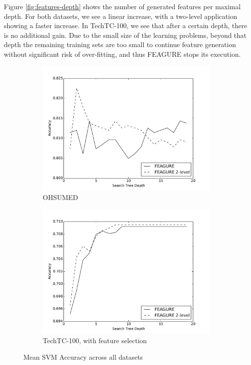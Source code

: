 \documentclass[twoside,11pt]{article}
\theoremstyle{definition}
\begin{document}
Figure \ref{fig:features-depth} shows the number of generated features per maximal depth.  For both datasets, we see a linear increase, with a two-level application showing a faster increase. In TechTC-100, we see that after a certain depth, there is no additional gain. Due to the small size of the learning problems, beyond that depth the remaining training sets are too small to continue feature generation without significant risk of over-fitting, and thus FEAGURE stops its execution.

\begin{figure}
	\centering
	\begin{subfigure}{.55\textwidth}
		\centering
		\includegraphics[width=1.1\linewidth]{new_depth_ohsumed_fixed.pdf}
		\caption{OHSUMED}
		\label{fig:svm-ohsumed}
	\end{subfigure}%
	\begin{subfigure}{.55\textwidth}
		\centering
		\includegraphics[width=1.1\linewidth]{new_depth_005_techtc.pdf}
		\caption{TechTC-100, with feature selection}
		\label{fig:svm-techtc}
	\end{subfigure}
	\caption{Mean SVM Accuracy across all datasets}
	\label{fig:svm-acc}
\end{figure}
\end{document}
